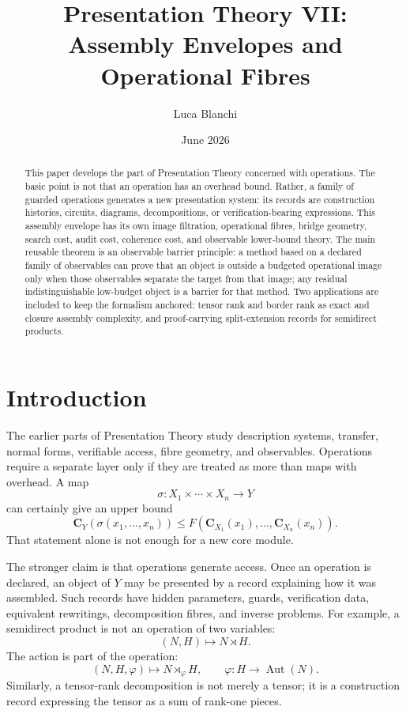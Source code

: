 \documentclass[11pt]{article}
\title{Presentation Theory VII: Assembly Envelopes and Operational Fibres}
\author{Luca Blanchi}
\date{June 2026}
\begin{document}
\maketitle

\begin{abstract}
This paper develops the part of Presentation Theory concerned with operations.  The basic point is not that an operation has an overhead bound.  Rather, a family of guarded operations generates a new presentation system: its records are construction histories, circuits, diagrams, decompositions, or verification-bearing expressions.  This assembly envelope has its own image filtration, operational fibres, bridge geometry, search cost, audit cost, coherence cost, and observable lower-bound theory.  The main reusable theorem is an observable barrier principle: a method based on a declared family of observables can prove that an object is outside a budgeted operational image only when those observables separate the target from that image; any residual indistinguishable low-budget object is a barrier for that method.  Two applications are included to keep the formalism anchored: tensor rank and border rank as exact and closure assembly complexity, and proof-carrying split-extension records for semidirect products.
\end{abstract}

\section{Introduction}

The earlier parts of Presentation Theory study description systems, transfer, normal forms, verifiable access, fibre geometry, and observables.  Operations require a separate layer only if they are treated as more than maps with overhead.  A map
\[
\sigma:X_1\times\cdots\times X_n\to Y
\]
can certainly give an upper bound
\[
\mathbf C_Y(\sigma(x_1,\ldots,x_n))
\le
F(\mathbf C_{X_1}(x_1),\ldots,\mathbf C_{X_n}(x_n)).
\]
That statement alone is not enough for a new core module.

The stronger claim is that operations generate access.  Once an operation is declared, an object of \(Y\) may be presented by a record explaining how it was assembled.  Such records have hidden parameters, guards, verification data, equivalent rewritings, decomposition fibres, and inverse problems.  For example, a semidirect product is not an operation of two variables:
\[
(N,H)\mapsto N\rtimes H.
\]
The action is part of the operation:
\[
(N,H,\varphi)\mapsto N\rtimes_{\varphi} H,
\qquad
\varphi:H\to\operatorname{Aut}(N).
\]
Similarly, a tensor-rank decomposition is not merely a tensor; it is a construction record expressing the tensor as a sum of rank-one pieces.
\end{document}
